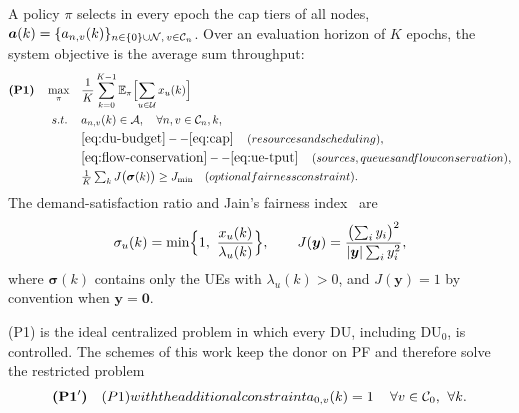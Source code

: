 \begin{EnChapter}
A policy $\pi$ selects in every epoch the cap tiers of all nodes,
$\bm a(k) = \{a_{n,v}(k)\}_{n \in \{0\}\cup\mathcal{N},\, v \in \mathcal{C}_n}$. Over an
evaluation horizon of $K$ epochs, the system objective is the average sum
throughput:
\begin{subequations}
\label{eq:P1}
\begin{align}
  \textbf{(P1)}\quad \max_{\pi} \quad & \frac{1}{K} \sum_{k=0}^{K-1} \E_\pi\Bigl[ \sum_{u \in \Uset} x_u(k) \Bigr] \label{eq:P1-obj} \\
  \text{s.t.} \quad
  & a_{n,v}(k) \in \Aset, \quad \forall n, v \in \Cset_n, k, \label{eq:P1-action} \\
  & \text{\eqref{eq:du-budget}--\eqref{eq:cap}} \quad \text{(resources and scheduling)}, \\
  & \text{\eqref{eq:flow-conservation}--\eqref{eq:ue-tput}} \quad \text{(sources, queues and flow conservation)}, \\
  & \textstyle \frac{1}{K}\sum_{k} J\bigl(\bm\sigma(k)\bigr) \ge J_{\min} \quad \text{(optional fairness constraint)}. \label{eq:P1-fair}
\end{align}
\end{subequations}
The demand-satisfaction ratio and Jain's fairness index~\cite{jain1984fairness} are
\begin{equation}
  \sigma_u(k) = \min\Bigl\{ 1,\ \frac{x_u(k)}{\lambda_u(k)} \Bigr\}, \qquad
  J(\bm y) = \frac{\bigl(\sum_{i} y_i\bigr)^2}{|\bm y| \sum_i y_i^2},
  \label{eq:metrics}
\end{equation}
where $\bm\sigma(k)$ contains only the UEs with $\lambda_u(k) > 0$, and
$J(\bm y) = 1$ by convention when $\bm y = \bm 0$.

(P1) is the ideal centralized problem in which every DU, including DU$_0$, is
controlled. The schemes of this work keep the donor on PF and therefore solve the
restricted problem
\begin{equation}
  \textbf{(P1$'$)}\quad \text{(P1) with the additional constraint } a_{0,v}(k) = 1 \quad \forall v \in \Cset_0,\ \forall k .
  \label{eq:P1r}
\end{equation}


\end{EnChapter}
